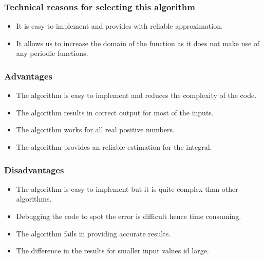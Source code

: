 \documentclass[12pt]{report}
\begin{document}
\subsubsection{Technical reasons for selecting this algorithm}
\begin{itemize}
    \item It is easy to implement and provides with reliable approximation.
    \item It allows us to increase the domain of the function as it does not make use of any periodic functions.
\end{itemize}

\subsubsection{Advantages}
\begin{itemize}
\item The algorithm is easy to implement and reduces the complexity of the code.
\item The algorithm results in correct output for most of the inputs.
\item The algorithm works for all real positive numbers.
\item The algorithm provides an reliable estimation for the integral.
\end{itemize}

\subsubsection{Disadvantages}
\begin{itemize}
\item The algorithm is easy to implement but it is quite complex than other algorithms.
\item Debugging the code to spot the error is difficult hence time consuming.
\item The algorithm fails in providing accurate results.
\item The difference in the results for smaller input values id large.
\end{itemize}
\end{document}
